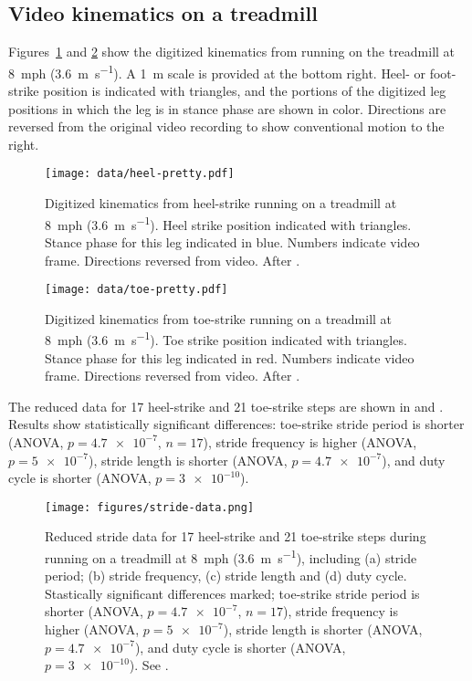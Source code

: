 \subsection{Video kinematics on a treadmill}
Figures~\ref{fig:results:heelpretty} and \ref{fig:results:toepretty} show the digitized kinematics from running on the treadmill at \SI{8}{mph} (\SI{3.6}{\meter\per\second}). A \SI{1}{\meter} scale is provided at the bottom right. Heel- or foot-strike position is indicated with triangles, and the portions of the digitized leg positions in which the leg is in stance phase are shown in color. Directions are reversed from the original video recording to show conventional motion to the right. 
\begin{figure}[p]
\begin{center}
\texttt{[image: data/heel-pretty.pdf]}
\end{center}
\caption{Digitized kinematics from heel-strike running on a treadmill at \SI{8}{mph} (\SI{3.6}{\meter\per\second}). Heel strike position indicated with triangles. Stance phase for this leg indicated in blue. Numbers indicate video frame. Directions reversed from video. After \citep{marey1873locomotion, muybridge1901human}.}  
\label{fig:results:heelpretty}
\end{figure}

\begin{figure}[p]
\begin{center}
\texttt{[image: data/toe-pretty.pdf]}
\end{center}
\caption{Digitized kinematics from toe-strike running on a treadmill at \SI{8}{mph} (\SI{3.6}{\meter\per\second}). Toe strike position indicated with triangles. Stance phase for this leg indicated in red. Numbers indicate video frame. Directions reversed from video. After \citep{marey1873locomotion, muybridge1901human}.}  
\label{fig:results:toepretty}
\end{figure}

The reduced data for 17 heel-strike and 21 toe-strike steps are shown in  and . Results show statistically significant differences: toe-strike stride period is shorter (ANOVA, $p=\num{4.7e-7}$, $n=17$), stride frequency is higher (ANOVA, $p=\num{5e-7}$), stride length is shorter (ANOVA, $p=\num{4.7e-7}$), and duty cycle is shorter (ANOVA, $p=\num{3e-10}$).
\begin{figure}
\begin{center}
\texttt{[image: figures/stride-data.png]}
\end{center}
\caption{Reduced stride data for 17 heel-strike and 21 toe-strike steps during running on a treadmill at \SI{8}{mph} (\SI{3.6}{\meter\per\second}), including (a) stride period; (b) stride frequency, (c) stride length and (d) duty cycle. Stastically significant differences marked; toe-strike stride period is shorter (ANOVA, $p=\num{4.7e-7}$, $n=17$), stride frequency is higher (ANOVA, $p=\num{5e-7}$), stride length is shorter (ANOVA, $p=\num{4.7e-7}$), and duty cycle is shorter (ANOVA, $p=\num{3e-10}$). See .} 
\label{fig:results:stride}
\end{figure}

